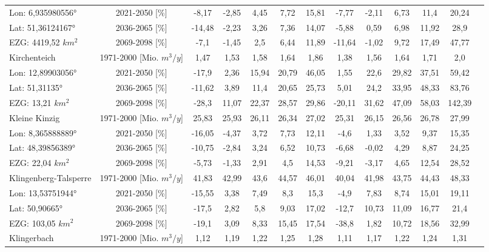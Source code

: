 \begin{longtable}{@{\extracolsep{\fill}}lc|ccccc||cccccc}
\cline{2-13} 
Lon: 6,935980556° & 2021-2050 [\%]  & -8,17 & -2,85 & 4,45 & 7,72 & 15,81 & -7,77 & -2,11 & 6,73 & 11,4 & 20,24 & \\ 
Lat: 51,36124167° & 2036-2065 [\%]  & -14,48 & -2,23 & 3,26 & 7,36 & 14,07 & -5,88 & 0,59 & 6,98 & 11,92 & 28,9 & \\ 
EZG: 4419,52 $km^2$ & 2069-2098 [\%]  & -7,1 & -1,45 & 2,5 & 6,44 & 11,89 & -11,64 & -1,02 & 9,72 & 17,49 & 47,77 & \\ 
\hline 
Kirchenteich & 1971-2000 [Mio. $m^3/y$]  & 1,47 & 1,53 & 1,58 & 1,64 & 1,86 & 1,38 & 1,56 & 1,64 & 1,71 & 2,0 & \\ 
\cline{2-13} 
Lon: 12,89903056° & 2021-2050 [\%]  & -17,9 & 2,36 & 15,94 & 20,79 & 46,05 & 1,55 & 22,6 & 29,82 & 37,51 & 59,42 & \\ 
Lat: 51,31135° & 2036-2065 [\%]  & -11,62 & 3,89 & 11,4 & 20,65 & 25,73 & 5,01 & 24,2 & 33,95 & 48,33 & 83,76 & \\ 
EZG: 13,21 $km^2$ & 2069-2098 [\%]  & -28,3 & 11,07 & 22,37 & 28,57 & 29,86 & -20,11 & 31,62 & 47,09 & 58,03 & 142,39 & \\ 
\hline 
Kleine Kinzig & 1971-2000 [Mio. $m^3/y$]  & 25,83 & 25,93 & 26,11 & 26,34 & 27,02 & 25,31 & 26,15 & 26,56 & 26,78 & 27,99 & \\ 
\cline{2-13} 
Lon: 8,365888889° & 2021-2050 [\%]  & -16,05 & -4,37 & 3,72 & 7,73 & 12,11 & -4,6 & 1,33 & 3,52 & 9,37 & 15,35 & \\ 
Lat: 48,39856389° & 2036-2065 [\%]  & -10,75 & -2,84 & 3,24 & 6,52 & 10,73 & -6,68 & -0,02 & 4,29 & 8,87 & 24,25 & \\ 
EZG: 22,04 $km^2$ & 2069-2098 [\%]  & -5,73 & -1,33 & 2,91 & 4,5 & 14,53 & -9,21 & -3,17 & 4,65 & 12,54 & 28,52 & \\ 
\hline 
Klingenberg-Talsperre & 1971-2000 [Mio. $m^3/y$]  & 41,83 & 42,99 & 43,6 & 44,57 & 46,01 & 40,04 & 41,98 & 43,75 & 44,43 & 48,33 & \\ 
\cline{2-13} 
Lon: 13,53751944° & 2021-2050 [\%]  & -15,55 & 3,38 & 7,49 & 8,3 & 15,3 & -4,9 & 7,83 & 8,74 & 15,01 & 19,11 & \\ 
Lat: 50,90665° & 2036-2065 [\%]  & -17,5 & 2,82 & 5,8 & 9,03 & 17,02 & -12,7 & 10,73 & 11,09 & 16,77 & 21,4 & \\ 
EZG: 103,05 $km^2$ & 2069-2098 [\%]  & -19,1 & 3,09 & 8,33 & 15,45 & 17,54 & -38,8 & 1,82 & 10,72 & 18,56 & 32,99 & \\ 
\hline 
Klingerbach & 1971-2000 [Mio. $m^3/y$]  & 1,12 & 1,19 & 1,22 & 1,25 & 1,28 & 1,11 & 1,17 & 1,22 & 1,24 & 1,31 & \\ 

\end{longtable}
